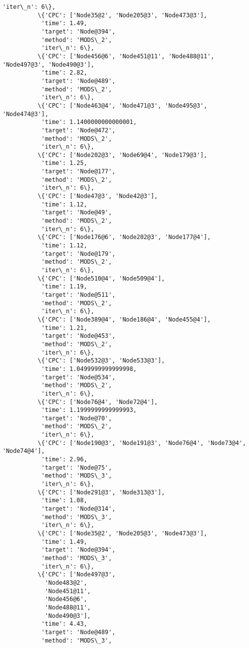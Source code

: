 \documentclass[11pt]{article}
\begin{document}
\begin{Verbatim}[commandchars=\\\{\}]
           'iter\_n': 6\},
          \{'CPC': ['Node35@2', 'Node205@3', 'Node473@3'],
           'time': 1.49,
           'target': 'Node@394',
           'method': 'MODS\_2',
           'iter\_n': 6\},
          \{'CPC': ['Node456@6', 'Node451@11', 'Node488@11', 'Node497@3', 'Node490@3'],
           'time': 2.82,
           'target': 'Node@489',
           'method': 'MODS\_2',
           'iter\_n': 6\},
          \{'CPC': ['Node463@4', 'Node471@3', 'Node495@3', 'Node474@3'],
           'time': 1.1400000000000001,
           'target': 'Node@472',
           'method': 'MODS\_2',
           'iter\_n': 6\},
          \{'CPC': ['Node202@3', 'Node69@4', 'Node179@3'],
           'time': 1.25,
           'target': 'Node@177',
           'method': 'MODS\_2',
           'iter\_n': 6\},
          \{'CPC': ['Node47@3', 'Node42@3'],
           'time': 1.12,
           'target': 'Node@49',
           'method': 'MODS\_2',
           'iter\_n': 6\},
          \{'CPC': ['Node176@6', 'Node202@3', 'Node177@4'],
           'time': 1.12,
           'target': 'Node@179',
           'method': 'MODS\_2',
           'iter\_n': 6\},
          \{'CPC': ['Node510@4', 'Node509@4'],
           'time': 1.19,
           'target': 'Node@511',
           'method': 'MODS\_2',
           'iter\_n': 6\},
          \{'CPC': ['Node389@4', 'Node186@4', 'Node455@4'],
           'time': 1.21,
           'target': 'Node@453',
           'method': 'MODS\_2',
           'iter\_n': 6\},
          \{'CPC': ['Node532@3', 'Node533@3'],
           'time': 1.0499999999999998,
           'target': 'Node@534',
           'method': 'MODS\_2',
           'iter\_n': 6\},
          \{'CPC': ['Node76@4', 'Node72@4'],
           'time': 1.1999999999999993,
           'target': 'Node@70',
           'method': 'MODS\_2',
           'iter\_n': 6\},
          \{'CPC': ['Node190@3', 'Node191@3', 'Node76@4', 'Node73@4', 'Node74@4'],
           'time': 2.96,
           'target': 'Node@75',
           'method': 'MODS\_3',
           'iter\_n': 6\},
          \{'CPC': ['Node291@3', 'Node313@3'],
           'time': 1.08,
           'target': 'Node@314',
           'method': 'MODS\_3',
           'iter\_n': 6\},
          \{'CPC': ['Node35@2', 'Node205@3', 'Node473@3'],
           'time': 1.49,
           'target': 'Node@394',
           'method': 'MODS\_3',
           'iter\_n': 6\},
          \{'CPC': ['Node497@3',
            'Node483@2',
            'Node451@11',
            'Node456@6',
            'Node488@11',
            'Node490@3'],
           'time': 4.43,
           'target': 'Node@489',
           'method': 'MODS\_3',

\end{Verbatim}
\end{document}
